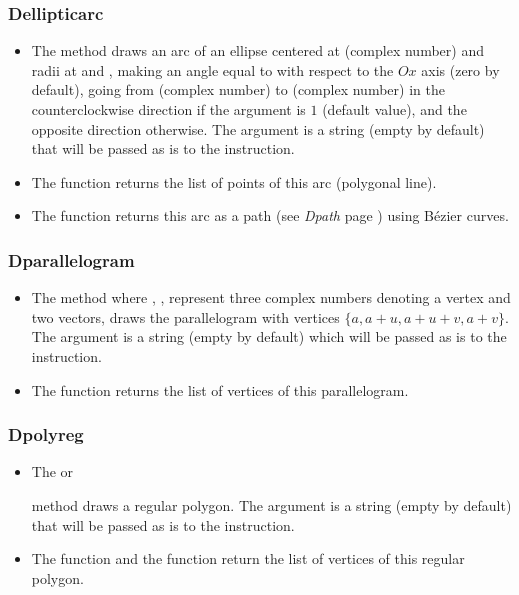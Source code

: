 \subsubsection{Dellipticarc}
\begin{itemize}
    \item The method  draws an arc of an ellipse centered at  (complex number) and radii at  and , making an angle equal to  with respect to the \(Ox\) axis (zero by default), going from  (complex number) to  (complex number) in the counterclockwise direction if the argument  is $1$ (default value), and the opposite direction otherwise. The  argument is a string (empty by default) that will be passed as is to the \drawcmd instruction.
    \item The  function returns the list of points of this arc (polygonal line).
    \item The  function returns this arc as a path (see \emph{Dpath} page \pageref{Dpath}) using Bézier curves.
\end{itemize}

\subsubsection{Dparallelogram}
\begin{itemize}
    \item The method  where , ,  represent three complex numbers denoting a vertex and two vectors, draws the parallelogram with vertices $\{a,a+u,a+u+v,a+v\}$. The argument  is a string (empty by default) which will be passed as is to the \drawcmd instruction.
    \item The function  returns the list of vertices of this parallelogram.
\end{itemize}

\subsubsection{Dpolyreg}
\begin{itemize}
    \item The  or \par {} method draws a regular polygon. The  argument is a string (empty by default) that will be passed as is to the \drawcmd instruction.
    \item The  function and the  function return the list of vertices of this regular polygon. \end{itemize}

